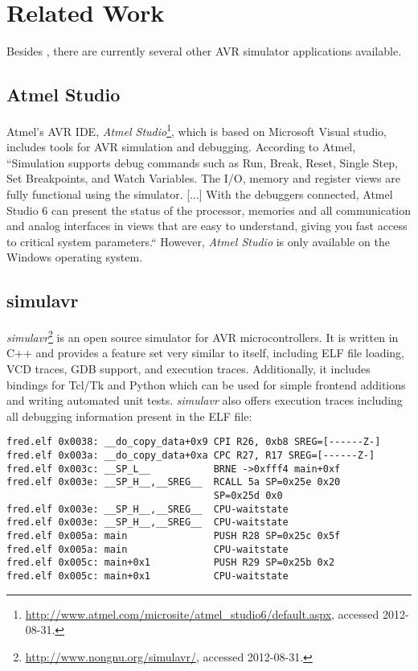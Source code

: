 
\chapter{Related Work} \label{chapter:relatedwork}

Besides \simavr, there are currently several other \ac{AVR} simulator
applications available.

\section{Atmel Studio}

Atmel's \ac{AVR} \ac{IDE}, \emph{Atmel Studio}\footnote{
%
\url{http://www.atmel.com/microsite/atmel_studio6/default.aspx}, accessed 2012-08-31.
%
}, which is based on Microsoft Visual studio, includes tools for \ac{AVR} simulation
and debugging. According to Atmel,
``Simulation supports debug commands such as Run, Break, Reset, Single Step,
Set Breakpoints, and Watch Variables. The I/O, memory and register views are
fully functional using the simulator. [...] With the debuggers connected, Atmel
Studio 6 can present the status of the processor, memories and all communication
and analog interfaces in views that are easy to understand, giving you fast
access to critical system parameters.`` \cite{atmel} However, \emph{Atmel Studio}
is only available on the Windows operating system.

\section{simulavr}

\emph{simulavr}\footnote{
%
\url{http://www.nongnu.org/simulavr/}, accessed 2012-08-31.
%
} is an open source simulator for \ac{AVR} microcontrollers. It is written in
C++ and provides a feature set very similar to \simavr itself, including \ac{ELF}
file loading, \ac{VCD} traces, \ac{GDB} support, and execution traces.
Additionally, it includes bindings for Tcl/Tk and Python which can be used for
simple frontend additions and writing automated unit tests. \emph{simulavr}
also offers execution traces including all debugging information present
in the \ac{ELF} file:

\begin{verbatim}
fred.elf 0x0038: __do_copy_data+0x9 CPI R26, 0xb8 SREG=[------Z-]
fred.elf 0x003a: __do_copy_data+0xa CPC R27, R17 SREG=[------Z-]
fred.elf 0x003c: __SP_L__           BRNE ->0xfff4 main+0xf
fred.elf 0x003e: __SP_H__,__SREG__  RCALL 5a SP=0x25e 0x20
                                    SP=0x25d 0x0
fred.elf 0x003e: __SP_H__,__SREG__  CPU-waitstate
fred.elf 0x003e: __SP_H__,__SREG__  CPU-waitstate
fred.elf 0x005a: main               PUSH R28 SP=0x25c 0x5f
fred.elf 0x005a: main               CPU-waitstate
fred.elf 0x005c: main+0x1           PUSH R29 SP=0x25b 0x2
fred.elf 0x005c: main+0x1           CPU-waitstate
\end{verbatim}

